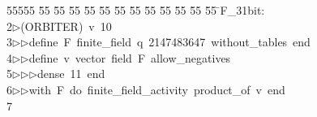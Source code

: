 %
%
\begin{tabbing}
55555 \= 55 \= 55 \= 55 \= 55 \= 55 \= 55 \= 55 \= 55 \= 55 \= 55 \= 55 \= 55 \= \>F\_31bit:\\[0pt]
2\>$\triangleright$\>(ORBITER)\ v\ 10\ \\[0pt]
3\>$\triangleright$\>$\triangleright$\>define\ F\ finite\_field\ q\ 2147483647\ without\_tables\ end\ \\[0pt]
4\>$\triangleright$\>$\triangleright$\>define\ v\ vector\ field\ F\ allow\_negatives\ \\[0pt]
5\>$\triangleright$\>$\triangleright$\>$\triangleright$\>dense\ 11\ end\ \\[0pt]
6\>$\triangleright$\>$\triangleright$\>with\ F\ do\ finite\_field\_activity\ product\_of\ v\ end\\[0pt]
7\>\end{tabbing}
